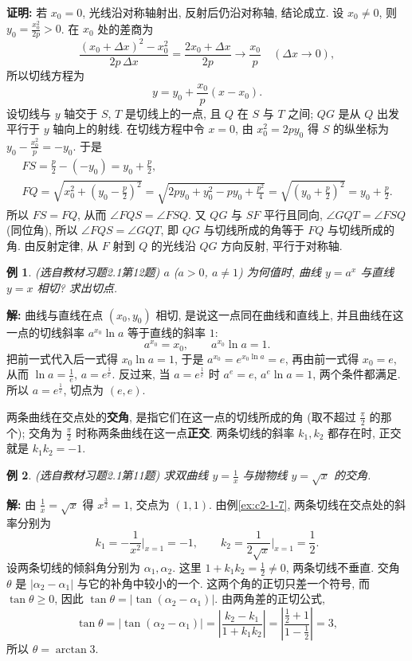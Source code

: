 \documentclass[UTF8,openany]{ctexbook}
\theoremstyle{chinesetextbook}
\newtheorem{example}{例}[section]
\newenvironment{cnproof}{\par\indent\textbf{证明:} \ignorespaces}{\par}
\newenvironment{cnsolution}{\par\indent\textbf{解:} \ignorespaces}{\par}
\begin{document}
\begin{cnproof}
若 $x_0=0$, 光线沿对称轴射出, 反射后仍沿对称轴, 结论成立. 设 $x_0\ne0$, 则 $\displaystyle y_0=\frac{x_0^2}{2p}>0$. 在 $x_0$ 处的差商为
\[
\frac{(x_0+\Delta x)^2-x_0^2}{2p\,\Delta x}=\frac{2x_0+\Delta x}{2p}\to\frac{x_0}p\quad(\Delta x\to0),
\]
所以切线方程为
\[
y=y_0+\frac{x_0}p(x-x_0).
\]
设切线与 $y$ 轴交于 $S$, $T$ 是切线上的一点, 且 $Q$ 在 $S$ 与 $T$ 之间; $QG$ 是从 $Q$ 出发平行于 $y$ 轴向上的射线. 在切线方程中令 $x=0$, 由 $x_0^2=2py_0$ 得 $S$ 的纵坐标为 $\displaystyle y_0-\frac{x_0^2}p=-y_0$. 于是
\[
\begin{gathered}
FS=\frac p2-(-y_0)=y_0+\frac p2,\\
FQ=\sqrt{x_0^2+\left(y_0-\frac p2\right)^2}=\sqrt{2py_0+y_0^2-py_0+\frac{p^2}4}=\sqrt{\left(y_0+\frac p2\right)^2}=y_0+\frac p2.
\end{gathered}
\]
所以 $FS=FQ$, 从而 $\angle FQS=\angle FSQ$. 又 $QG$ 与 $SF$ 平行且同向, $\angle GQT=\angle FSQ$ (同位角), 所以 $\angle FQS=\angle GQT$, 即 $QG$ 与切线所成的角等于 $FQ$ 与切线所成的角. 由反射定律, 从 $F$ 射到 $Q$ 的光线沿 $QG$ 方向反射, 平行于对称轴.
\end{cnproof}
\begin{example}\label{ex:c2-h1-12}
\textnormal{(选自教材习题2.1第12题)} $a$ ($a>0$, $a\ne1$) 为何值时, 曲线 $y=a^x$ 与直线 $y=x$ 相切? 求出切点.
\end{example}
\begin{cnsolution}
曲线与直线在点 $(x_0,y_0)$ 相切, 是说这一点同在曲线和直线上, 并且曲线在这一点的切线斜率 $a^{x_0}\ln a$ 等于直线的斜率 $1$:
\[
a^{x_0}=x_0,\qquad a^{x_0}\ln a=1.
\]
把前一式代入后一式得 $x_0\ln a=1$, 于是 $a^{x_0}=e^{x_0\ln a}=e$, 再由前一式得 $x_0=e$, 从而 $\displaystyle\ln a=\frac1e$, $a=e^{\frac1e}$. 反过来, 当 $a=e^{\frac1e}$ 时 $a^e=e$, $a^e\ln a=1$, 两个条件都满足. 所以 $a=e^{\frac1e}$, 切点为 $(e,e)$.
\end{cnsolution}
两条曲线在交点处的\textbf{交角}, 是指它们在这一点的切线所成的角 (取不超过 $\displaystyle\frac\pi2$ 的那个); 交角为 $\displaystyle\frac\pi2$ 时称两条曲线在这一点\textbf{正交}. 两条切线的斜率 $k_1,k_2$ 都存在时, 正交就是 $k_1k_2=-1$.
\begin{example}\label{ex:c2-h1-11}
\textnormal{(选自教材习题2.1第11题)} 求双曲线 $\displaystyle y=\frac1x$ 与抛物线 $y=\sqrt x$ 的交角.
\end{example}
\begin{cnsolution}
由 $\displaystyle\frac1x=\sqrt x$ 得 $x^{\frac32}=1$, 交点为 $(1,1)$. 由例\ref{ex:c2-1-7}, 两条切线在交点处的斜率分别为
\[
k_1=-\frac1{x^2}\bigg|_{x=1}=-1,\qquad k_2=\frac1{2\sqrt x}\bigg|_{x=1}=\frac12.
\]
设两条切线的倾斜角分别为 $\alpha_1,\alpha_2$. 这里 $\displaystyle1+k_1k_2=\frac12\ne0$, 两条切线不垂直. 交角 $\theta$ 是 $|\alpha_2-\alpha_1|$ 与它的补角中较小的一个. 这两个角的正切只差一个符号, 而 $\tan\theta\ge0$, 因此 $\tan\theta=|\tan(\alpha_2-\alpha_1)|$. 由两角差的正切公式,
\[
\tan\theta=|\tan(\alpha_2-\alpha_1)|=\left|\frac{k_2-k_1}{1+k_1k_2}\right|=\left|\frac{\frac12+1}{1-\frac12}\right|=3,
\]
所以 $\theta=\arctan3$.
\end{cnsolution}
\end{document}
